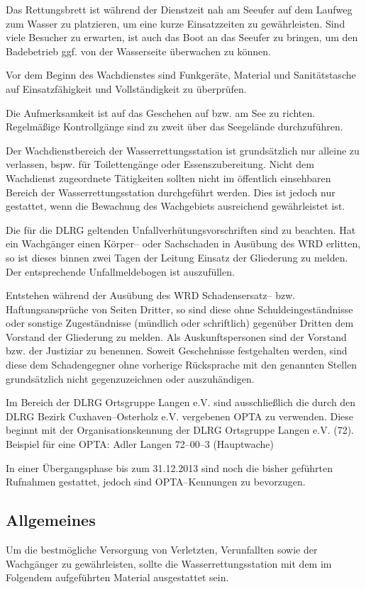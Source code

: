 Das Rettungsbrett ist während der Dienstzeit nah am Seeufer auf dem Laufweg zum Wasser zu platzieren, um eine kurze Einsatzzeiten zu gewährleisten. Sind viele Besucher zu erwarten, ist auch das Boot an das Seeufer zu bringen, um den Badebetrieb ggf. von der Wasserseite überwachen zu können.

Vor dem Beginn des Wachdienstes sind Funkgeräte, Material und Sanitätstasche auf Einsatzfähigkeit und Vollständigkeit zu überprüfen.

Die Aufmerksamkeit ist auf das Geschehen auf bzw. am See zu richten. Regelmäßige Kontrollgänge sind zu zweit über das Seegelände durchzuführen. 

Der Wachdienstbereich der Wasserrettungsstation ist grundsätzlich nur alleine zu verlassen, bspw. für Toilettengänge oder Essenszubereitung. Nicht dem Wachdienst zugeordnete Tätigkeiten sollten nicht im öffentlich einsehbaren Bereich der Wasserrettungsstation durchgeführt werden. Dies ist jedoch nur gestattet, wenn die Bewachung des Wachgebiets ausreichend gewährleistet ist. 

Die für die DLRG geltenden Unfallverhütungsvorschriften sind zu beachten. Hat ein Wachgänger einen Körper-- oder Sachschaden in Ausübung des WRD erlitten, so ist dieses binnen zwei Tagen der Leitung Einsatz der Gliederung zu melden. Der entsprechende Unfallmeldebogen ist auszufüllen.

Entstehen während der Ausübung des WRD Schadensersatz-- bzw. Haftungsansprüche von Seiten Dritter, so sind diese ohne Schuldeingeständnisse oder sonstige Zugeständnisse (mündlich oder schriftlich) gegenüber Dritten dem Vorstand der Gliederung zu melden. Als Auskunftspersonen sind der Vorstand bzw. der Justiziar zu benennen. Soweit Geschehnisse festgehalten werden, sind diese dem Schadengegner ohne vorherige Rücksprache mit den genannten Stellen grundsätzlich nicht gegenzuzeichnen oder auszuhändigen.

Im Bereich der DLRG Ortsgruppe Langen e.V. sind ausschließlich die durch den DLRG Bezirk Cuxhaven--Osterholz e.V. vergebenen OPTA zu verwenden. Diese beginnt mit der Organisationskennung der DLRG Ortsgruppe Langen e.V. (72). Beispiel für eine OPTA: \glqq Adler Langen 72--00--3\grqq{} (Hauptwache)

In einer Übergangsphase bis zum 31.12.2013 sind noch die bisher geführten Rufnahmen gestattet, jedoch sind OPTA--Kennungen zu bevorzugen.

\subsection*{Allgemeines}
Um die bestmögliche Versorgung von Verletzten, Verunfallten sowie der Wachgänger zu gewährleisten, sollte die Wasserrettungsstation mit dem im Folgendem aufgeführten Material ausgestattet sein. 

